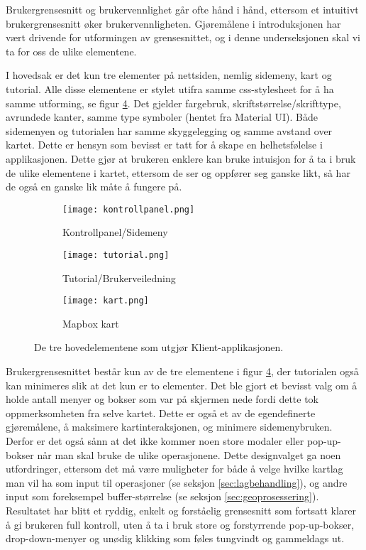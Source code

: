 Brukergrensesnitt og brukervennlighet går ofte hånd i hånd, ettersom et intuitivt brukergrensesnitt øker brukervennligheten. Gjøremålene i introduksjonen har vært drivende for utformingen av grensesnittet, og i denne underseksjonen skal vi ta for oss de ulike elementene. 

I hovedsak er det kun tre elementer på nettsiden, nemlig sidemeny, kart og tutorial. Alle disse elementene er stylet utifra samme css-stylesheet for å ha samme utforming, se figur \ref{fig:elementer}. Det gjelder fargebruk, skriftstørrelse/skrifttype, avrundede kanter, samme type symboler (hentet fra Material UI). Både sidemenyen og tutorialen har samme skyggelegging og samme avstand over kartet. Dette er hensyn som bevisst er tatt for å skape en helhetsfølelse i applikasjonen. Dette gjør at brukeren enklere kan bruke intuisjon for å ta i bruk de ulike elementene i kartet, ettersom de ser og oppfører seg ganske likt, så har de også en ganske lik måte å fungere på.

\begin{figure}[h]
	\centering
	\begin{subfigure}{.33\textwidth}
		\centering
		\texttt{[image: kontrollpanel.png]}
		\caption{Kontrollpanel/Sidemeny}
		\label{fig:sub1}
	\end{subfigure}%
	\begin{subfigure}{.33\textwidth}
		\centering
		\texttt{[image: tutorial.png]}
		\caption{Tutorial/Brukerveiledning}
		\label{fig:sub2}
    \end{subfigure}
    \begin{subfigure}{.33\textwidth}
		\centering
		\texttt{[image: kart.png]}
		\caption{Mapbox kart}
		\label{fig:sub2}
	\end{subfigure}
	\caption{\small{De tre hovedelementene som utgjør Klient-applikasjonen.}}
	\label{fig:elementer}
\end{figure}

Brukergrensesnittet består kun av de tre elementene i figur \ref{fig:elementer}, der tutorialen også kan minimeres slik at det kun er to elementer. Det ble gjort et bevisst valg om å holde antall menyer og bokser som var på skjermen nede fordi dette tok oppmerksomheten fra selve kartet. Dette er også et av de egendefinerte gjøremålene, å maksimere kartinteraksjonen, og minimere sidemenybruken. Derfor er det også sånn at det ikke kommer noen store modaler eller pop-up-bokser når man skal bruke de ulike operasjonene. Dette designvalget ga noen utfordringer, ettersom det må være muligheter for både å velge hvilke kartlag man vil ha som input til operasjoner (se seksjon \ref{sec:lagbehandling}), og andre input som foreksempel buffer-størrelse (se seksjon \ref{sec:geoprosessering}). Resultatet har blitt et ryddig, enkelt og forståelig grensesnitt som fortsatt klarer å gi brukeren full kontroll, uten å ta i bruk store og forstyrrende pop-up-bokser, drop-down-menyer og unødig klikking som føles tungvindt og gammeldags ut.


